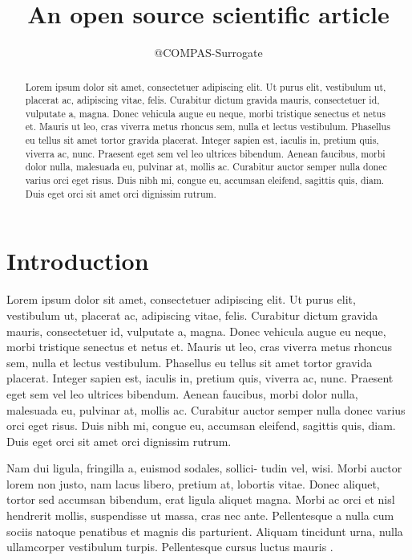 \documentclass[twocolumn]{aastex631}
\begin{document}
\title{An open source scientific article}

\author{@COMPAS-Surrogate}

\begin{abstract}
    Lorem ipsum dolor sit amet, consectetuer adipiscing elit.
    Ut purus elit, vestibulum ut, placerat ac, adipiscing vitae, felis.
    Curabitur dictum gravida mauris, consectetuer id, vulputate a, magna.
    Donec vehicula augue eu neque, morbi tristique senectus et netus et.
    Mauris ut leo, cras viverra metus rhoncus sem, nulla et lectus vestibulum.
    Phasellus eu tellus sit amet tortor gravida placerat.
    Integer sapien est, iaculis in, pretium quis, viverra ac, nunc.
    Praesent eget sem vel leo ultrices bibendum.
    Aenean faucibus, morbi dolor nulla, malesuada eu, pulvinar at, mollis ac.
    Curabitur auctor semper nulla donec varius orci eget risus.
    Duis nibh mi, congue eu, accumsan eleifend, sagittis quis, diam.
    Duis eget orci sit amet orci dignissim rutrum.
\end{abstract}

\section{Introduction}
\label{sec:intro}

Lorem ipsum dolor sit amet, consectetuer adipiscing elit.
Ut purus elit, vestibulum ut, placerat ac, adipiscing vitae, felis.
Curabitur dictum gravida mauris, consectetuer id, vulputate a, magna.
Donec vehicula augue eu neque, morbi tristique senectus et netus et.
Mauris ut leo, cras viverra metus rhoncus sem, nulla et lectus vestibulum.
Phasellus eu tellus sit amet tortor gravida placerat.
Integer sapien est, iaculis in, pretium quis, viverra ac, nunc.
Praesent eget sem vel leo ultrices bibendum.
Aenean faucibus, morbi dolor nulla, malesuada eu, pulvinar at, mollis ac.
Curabitur auctor semper nulla donec varius orci eget risus.
Duis nibh mi, congue eu, accumsan eleifend, sagittis quis, diam.
Duis eget orci sit amet orci dignissim rutrum.

Nam dui ligula, fringilla a, euismod sodales, sollici- tudin vel, wisi.
Morbi auctor lorem non justo, nam lacus libero, pretium at, lobortis vitae.
Donec aliquet, tortor sed accumsan bibendum, erat ligula aliquet magna.
Morbi ac orci et nisl hendrerit mollis, suspendisse ut massa, cras nec ante.
Pellentesque a nulla cum sociis natoque penatibus et magnis dis parturient.
Aliquam tincidunt urna, nulla ullamcorper vestibulum turpis.
Pellentesque cursus luctus mauris \citep{Luger2021}.
\end{document}
